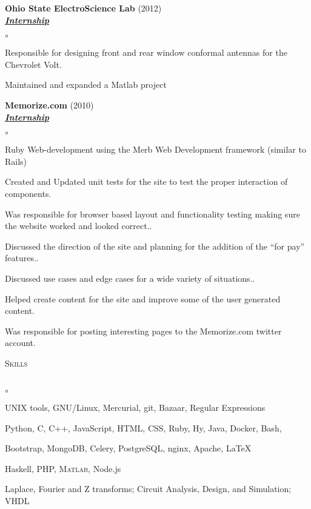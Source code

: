 \documentclass{article}
\newcommand{\lineunder}{\vspace*{-8pt} \\ \hspace*{-18pt} \hrulefill \\}
\newcommand{\header}[1]{{\hspace*{-15pt}\vspace*{6pt} \textsc{#1}} \vspace*{-6pt} \lineunder}
\newcommand{\employer}[3]{{ \textbf{#1} (#2)\\ \underline{\textbf{\emph{#3}}}\\  }}
\newenvironment{achievements}{\begin{list}{$\circ$}{\topsep 0pt \itemsep -2pt}}{\vspace*{4pt}\end{list}}
\begin{document}
\employer{Ohio State ElectroScience Lab}{2012}{Internship}
	\begin{achievements}
	\item Responsible for designing front and rear window conformal antennas for the Chevrolet Volt.
	\item Maintained and expanded a Matlab project
	\end{achievements}

\employer{Memorize.com}{2010}{Internship}
	\begin{achievements}
	\item Ruby Web-development using the Merb Web Development framework
(similar to Rails)
	\item Created and Updated unit tests for the site to test the proper
interaction of components.
	\item Was responsible for browser based layout and functionality testing
making sure the website worked and looked correct..
	\item Discussed the direction of the site and planning
for the addition of the ``for pay'' features..
	\item Discussed use cases and edge cases for a wide variety of
situations..
	\item Helped create content for the site and improve some of the
	user generated content.
	\item Was responsible for posting interesting pages to the Memorize.com twitter
	account.
	\end{achievements}

\header{Skills}
\begin{achievements}
	\item UNIX tools, GNU/Linux, Mercurial, git, Bazaar, Regular Expressions
	\item Python, C, C++, JavaScript, HTML, CSS, Ruby, Hy, Java, Docker, Bash,
	\item Bootstrap, MongoDB, Celery, PostgreSQL, nginx, Apache, \LaTeX
	\item Haskell, PHP, \textsc{Matlab}, Node.js
	\item Laplace, Fourier and Z transforms; Circuit Analysis, Design, and Simulation; VHDL
\end{achievements}
\end{document}
